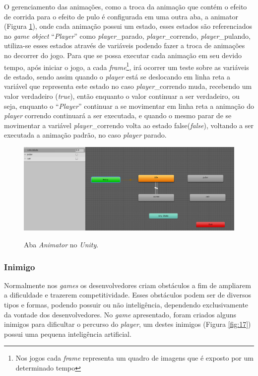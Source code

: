 \documentclass[
	12pt,				%
    oneside,			%
	a4paper,			%
	english,			%
	french,				%
	spanish,			%
	brazil,				%
	]{abntex2}
\begin{document}
				O gerenciamento das animações, como a troca da animação que contém o efeito de corrida para o efeito de pulo é configurada em uma outra aba, a animator (Figura \ref{fig:16}), onde cada animação possui um estado, esses estados são referenciados no \textit{game object} “\textit{Player}” como \textit{player}\_parado, \textit{player}\_correndo, \textit{player}\_pulando, utiliza-se esses estados através de variáveis podendo fazer a troca de animações no decorrer do jogo.
				Para que se possa executar cada animação em seu devido tempo, após iniciar o jogo, a cada \textit{frame}\footnote{Nos jogos cada \textit{frame} representa um quadro de imagens que é exposto por um determinado tempo}, irá ocorrer um teste sobre as variáveis de estado, sendo assim quando o \textit{player} está se deslocando em linha reta a variável que representa este estado no caso \textit{player}\_correndo muda, recebendo um valor verdadeiro (\textit{true}), então enquanto o valor continuar a ser verdadeiro, ou seja, enquanto o “\textit{Player}” continuar a se movimentar em linha reta a animação do \textit{player} correndo continuará a ser executada, e quando o mesmo parar de se movimentar a variável \textit{player}\_correndo volta ao estado false(\textit{false}), voltando a ser executada a animação padrão, no caso \textit{player} parado.
								
				\begin{figure}[H]
					\caption{Aba \textit{Animator} no \textit{Unity}.}
					\centering
					\includegraphics[width=1\linewidth]{Imagens/16}
					\label{fig:16}
				\end{figure}
				
				
			\subsubsection{Inimigo}
				Normalmente nos \textit{games} os desenvolvedores criam obstáculos a fim de ampliarem a dificuldade e trazerem competitividade. Esses obstáculos podem ser de diversos tipos e formas, podendo possuir ou não inteligência, dependendo exclusivamente da vontade dos desenvolvedores. No \textit{game} apresentado, foram criados alguns inimigos para dificultar o percurso do \textit{player}, um destes inimigos (Figura \ref{fig:17}) possui uma pequena inteligência artificial.
				
\end{document}

